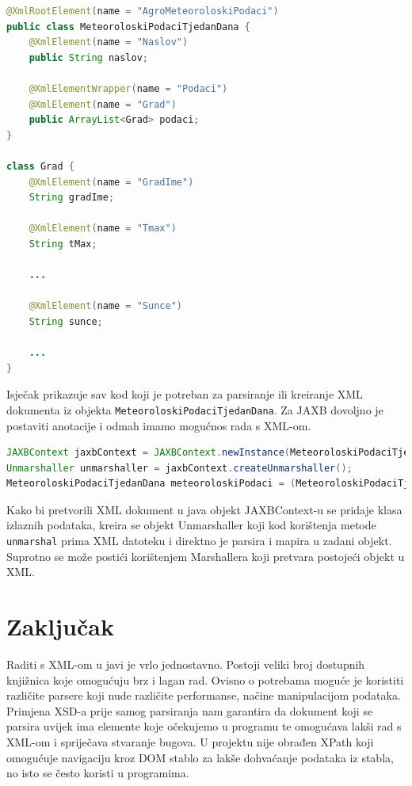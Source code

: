 \documentclass{foi}
\begin{document}
\begin{lstlisting}[language=java, caption={Primjer JAXB anotacija na klasama}]
@XmlRootElement(name = "AgroMeteoroloskiPodaci")
public class MeteoroloskiPodaciTjedanDana {
    @XmlElement(name = "Naslov")
    public String naslov;

    @XmlElementWrapper(name = "Podaci")
    @XmlElement(name = "Grad")
    public ArrayList<Grad> podaci;
}

class Grad {
    @XmlElement(name = "GradIme")
    String gradIme;

    @XmlElement(name = "Tmax")
    String tMax;

    ...

    @XmlElement(name = "Sunce")
    String sunce;

    ...
}
\end{lstlisting}

Isječak prikazuje sav kod koji je potreban za parsiranje ili kreiranje XML dokumenta iz
objekta \texttt{MeteoroloskiPodaciTjedanDana}. Za JAXB dovoljno je postaviti anotacije
i odmah imamo mogućnos rada s XML-om.

\begin{lstlisting}[language=java, caption={Pretvaranje XML dokumenta u Java objekte korištenjem JAXB}]
JAXBContext jaxbContext = JAXBContext.newInstance(MeteoroloskiPodaciTjedanDana.class);
Unmarshaller unmarshaller = jaxbContext.createUnmarshaller();
MeteoroloskiPodaciTjedanDana meteoroloskiPodaci = (MeteoroloskiPodaciTjedanDana) unmarshaller.unmarshal(DemoDatoteke.demoSedmodnevniPodaciXML());
\end{lstlisting}

Kako bi pretvorili XML dokument u java objekt JAXBContext-u se pridaje klasa izlaznih
podataka, kreira se objekt Unmarshaller koji kod korištenja metode \texttt{unmarshal}
prima XML datoteku i direktno je parsira i mapira u zadani objekt.
Suprotno se može postići korištenjem Marshallera koji pretvara postojeći objekt u XML.

\chapter{Zaključak}
Raditi s XML-om u javi je vrlo jednostavno. Postoji veliki broj dostupnih knjižnica koje
omogućuju brz i lagan rad. Ovisno o potrebama moguće je koristiti različite parsere koji
nude različite performanse, načine manipulacijom podataka. Primjena XSD-a prije samog
parsiranja nam garantira da dokument koji se parsira uvijek ima elemente koje očekujemo
u programu te omogućava lakši rad s XML-om i spriječava stvaranje bugova. U projektu nije
obrađen XPath koji omogućuje navigaciju kroz DOM stablo za lakše dohvaćanje podataka
iz stabla, no isto se često koristi u programima.


\printbibliography[title=Popis literature]

\listoffigures
{}
\end{document}
